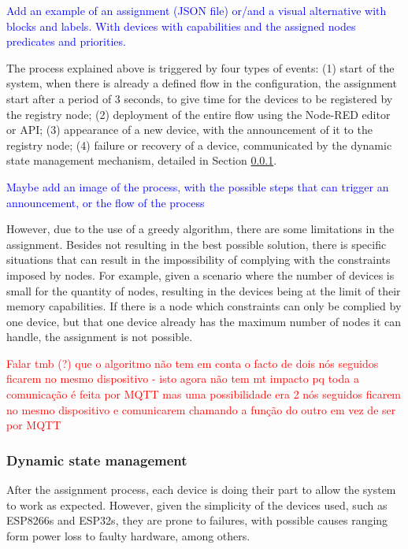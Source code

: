 \textcolor{blue}{Add an example of an assignment (JSON file) or/and a visual alternative with blocks and labels. With devices with capabilities and the assigned nodes predicates and priorities.}

The process explained above is triggered by four types of events: (1) start of the system, when there is already a defined flow in the configuration, the assignment start after a period of 3 seconds, to give time for the devices to be registered by the registry node; (2) deployment of the entire flow using the Node-RED editor or API; (3) appearance of a new device, with the announcement of it to the registry node; (4) failure or recovery of a device, communicated by the dynamic state management mechanism, detailed in Section \ref{sec:dynamic_state_management}.

\textcolor{blue}{Maybe add an image of the process, with the possible steps that can trigger an announcement, or the flow of the process}

However, due to the use of a greedy algorithm, there are some limitations in the assignment. Besides not resulting in the best possible solution, there is specific situations that can result in the impossibility of complying with the constraints imposed by nodes. For example, given a scenario where the number of devices is small for the quantity of nodes, resulting in the devices being at the limit of their memory capabilities. If there is a node which constraints can only be complied by one device, but that one device already has the maximum number of nodes it can handle, the assignment is not possible.

\textcolor{red}{Falar tmb (?) que o algoritmo não tem em conta o facto de dois nós seguidos ficarem no mesmo dispositivo - isto agora não tem mt impacto pq toda a comunicação é feita por MQTT mas uma possibilidade era 2 nós seguidos ficarem no mesmo dispositivo e comunicarem chamando a função do outro em vez de ser por MQTT}

\subsubsection{Dynamic state management}\label{sec:dynamic_state_management}

After the assignment process, each device is doing their part to allow the system to work as expected. However, given the simplicity of the devices used, such as ESP8266s and ESP32s, they are prone to failures, with possible causes ranging form power loss to faulty hardware, among others.


